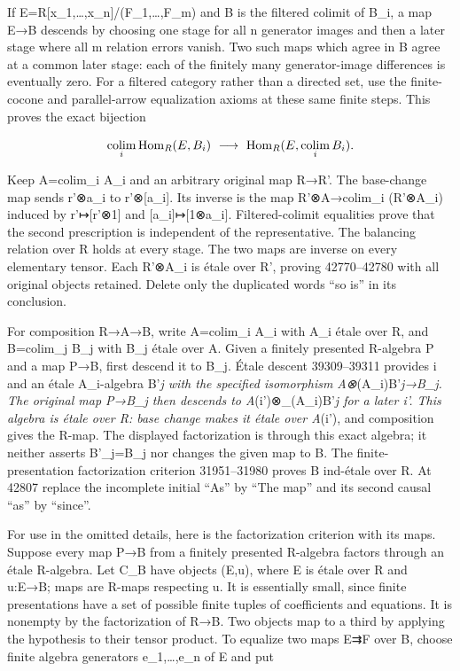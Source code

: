If E=R{[}x\_1,\ldots,x\_n{]}/(F\_1,\ldots,F\_m) and B is the filtered colimit of B\_i, a map E→B descends by choosing one stage for all n generator images and then a later stage where all m relation errors vanish. Two such maps which agree in B agree at a common later stage: each of the finitely many generator-image differences is eventually zero. For a filtered category rather than a directed set, use the finite-cocone and parallel-arrow equalization axioms at these same finite steps. This proves the exact bijection

\[
\mathop{\rm colim}_i\operatorname{Hom}_R(E,B_i)
\ \longrightarrow\ \operatorname{Hom}_R(E,\mathop{\rm colim}_iB_i).
\]

Keep A=colim\_i A\_i and an arbitrary original map R→R'. The base-change map sends r'⊗a\_i to r'⊗{[}a\_i{]}. Its inverse is the map R'⊗A→colim\_i (R'⊗A\_i) induced by r'↦{[}r'⊗1{]} and {[}a\_i{]}↦{[}1⊗a\_i{]}. Filtered-colimit equalities prove that the second prescription is independent of the representative. The balancing relation over R holds at every stage. The two maps are inverse on every elementary tensor. Each R'⊗A\_i is étale over R', proving 42770--42780 with all original objects retained. Delete only the duplicated words ``so is'' in its conclusion.

For composition R→A→B, write A=colim\_i A\_i with A\_i étale over R, and B=colim\_j B\_j with B\_j étale over A. Given a finitely presented R-algebra P and a map P→B, first descend it to B\_j. Étale descent 39309--39311 provides i and an étale A\_i-algebra B'\emph{j with the specified isomorphism A⊗}(A\_i)B'\emph{j→B\_j. The original map P→B\_j then descends to A}(i')⊗\_(A\_i)B'\emph{j for a later i'. This algebra is étale over R: base change makes it étale over A}(i'), and composition gives the R-map. The displayed factorization is through this exact algebra; it neither asserts B'\_j=B\_j nor changes the given map to B. The finite-presentation factorization criterion 31951--31980 proves B ind-étale over R. At 42807 replace the incomplete initial ``As'' by ``The map'' and its second causal ``as'' by ``since''.

For use in the omitted details, here is the factorization criterion with its maps. Suppose every map P→B from a finitely presented R-algebra factors through an étale R-algebra. Let C\_B have objects (E,u), where E is étale over R and u:E→B; maps are R-maps respecting u. It is essentially small, since finite presentations have a set of possible finite tuples of coefficients and equations. It is nonempty by the factorization of R→B. Two objects map to a third by applying the hypothesis to their tensor product. To equalize two maps E⇉F over B, choose finite algebra generators e\_1,\ldots,e\_n of E and put

